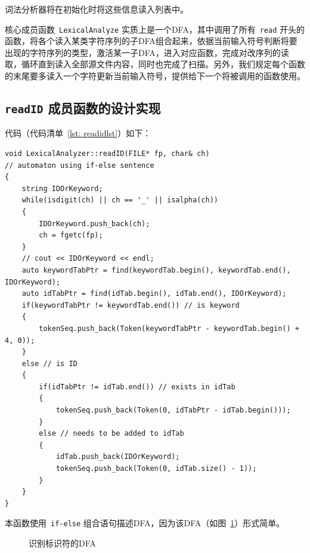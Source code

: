 \documentclass{article}
\begin{document}
\begin{CJK*}{UTF8}{gbsn}
词法分析器将在初始化时将这些信息读入列表中。

核心成员函数~\texttt{LexicalAnalyze} 实质上是一个DFA，其中调用了所有~\texttt{read} 开头的函数，将各个读入某类字符序列的子DFA组合起来，依据当前输入符号判断将要出现的字符序列的类型，激活某一子DFA，进入对应函数，完成对改序列的读取，循环直到读入全部源文件内容，同时也完成了扫描。另外，我们规定每个函数的末尾要多读入一个字符更新当前输入符号，提供给下一个将被调用的函数使用。

\subsection{\texttt{readID} 成员函数的设计实现}
代码（代码清单~\ref{lst: readidlst}）如下：
\begin{center}
\begin{lstlisting}[caption = {\texttt{readID} 成员函数代码清单}, label = {lst: readidlst}]
void LexicalAnalyzer::readID(FILE* fp, char& ch)
// automaton using if-else sentence
{
	string IDOrKeyword;
	while(isdigit(ch) || ch == '_' || isalpha(ch))
	{
		IDOrKeyword.push_back(ch);
		ch = fgetc(fp);
	}
	// cout << IDOrKeyword << endl;
	auto keywordTabPtr = find(keywordTab.begin(), keywordTab.end(), IDOrKeyword);
	auto idTabPtr = find(idTab.begin(), idTab.end(), IDOrKeyword);
	if(keywordTabPtr != keywordTab.end()) // is keyword
	{
		tokenSeq.push_back(Token(keywordTabPtr - keywordTab.begin() + 4, 0));
	}
	else // is ID
	{
		if(idTabPtr != idTab.end()) // exists in idTab
		{
			tokenSeq.push_back(Token(0, idTabPtr - idTab.begin()));
		}
		else // needs to be added to idTab
		{
			idTab.push_back(IDOrKeyword);
			tokenSeq.push_back(Token(0, idTab.size() - 1));
		}
	}
}
\end{lstlisting}
\end{center}

本函数使用~\texttt{if-else} 组合语句描述DFA，因为该DFA（如图~\ref{fig: iddfafig}）形式简单。

\begin{figure}[h!]
\centering
{}
\caption{识别标识符的DFA}
\label{fig: iddfafig}
\end{figure}


\end{CJK*}
\end{document}
